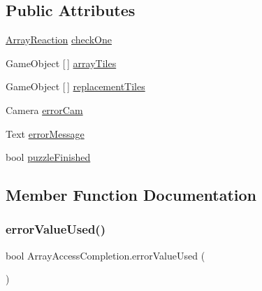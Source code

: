 \subsection*{Public Attributes}
\begin{DoxyCompactItemize}
\item 
\hyperlink{class_array_reaction}{Array\+Reaction} \hyperlink{class_array_access_completion_a5b7d8357b6c82703f06eaabee00d0f2f}{check\+One}
\item 
Game\+Object \mbox{[}$\,$\mbox{]} \hyperlink{class_array_access_completion_ae8c88b6f2dd0fe851c866097911df8e4}{array\+Tiles}
\item 
Game\+Object \mbox{[}$\,$\mbox{]} \hyperlink{class_array_access_completion_a97c6ec1f65786273d1186f23ce5b0f6c}{replacement\+Tiles}
\item 
Camera \hyperlink{class_array_access_completion_a0e0e013df2a9203aa27344b6090a56aa}{error\+Cam}
\item 
Text \hyperlink{class_array_access_completion_a03988dc3e4e687e24f0c2c57d75a03b0}{error\+Message}
\item 
bool \hyperlink{class_array_access_completion_a1cddf9521f110a2868afa36514c9dcb4}{puzzle\+Finished}
\end{DoxyCompactItemize}


\subsection{Member Function Documentation}
\mbox{\label{class_array_access_completion_a16f52bce4f85c9dc5e6f751531988bb0}} 
\subsubsection{\texorpdfstring{error\+Value\+Used()}{errorValueUsed()}}
{\footnotesize\ttfamily bool Array\+Access\+Completion.\+error\+Value\+Used (\begin{DoxyParamCaption}{ }\end{DoxyParamCaption})}

\mbox{\label{class_array_access_completion_ac3834cd64df95140d0becf11f7eb15de}} 
